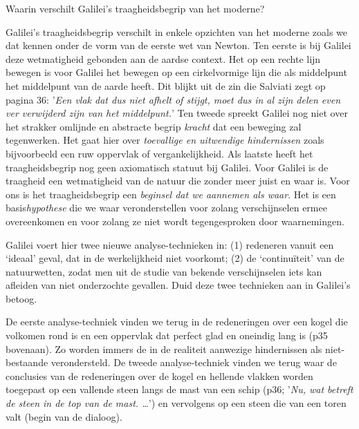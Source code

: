 \documentclass{ximera}
\begin{document}
\begin{exercise}
    \begin{question}  Waarin verschilt Galilei's traagheidsbegrip van het moderne?
	\begin{oplossing}
	Galilei's traagheidsbegrip verschilt in enkele opzichten van het moderne zoals we dat kennen onder de vorm van de eerste wet van Newton. Ten eerste is bij Galilei deze wetmatigheid gebonden aan de aardse context. Het op een rechte lijn bewegen is voor Galilei het bewegen op een cirkelvormige lijn die als middelpunt het middelpunt van de aarde heeft. Dit blijkt uit de zin die Salviati zegt op pagina 36: '\emph{Een vlak dat dus niet afhelt of stijgt, moet dus in al zijn delen even ver verwijderd zijn van het middelpunt.}' Ten tweede spreekt Galilei nog niet over het strakker omlijnde en abstracte begrip \emph{kracht} dat een beweging zal tegenwerken. Het gaat hier over \emph{toevallige en uitwendige hindernissen} zoals bijvoorbeeld een ruw oppervlak of vergankelijkheid. Als laatste heeft het traagheidsbegrip nog geen axiomatisch statuut bij Galilei. Voor Galilei is de traagheid een wetmatigheid van de natuur die zonder meer juist en waar is. Voor ons is het traagheidsbegrip een \emph{beginsel dat we aannemen als waar}. Het is een basis\emph{hypothese} die we waar veronderstellen voor zolang verschijnselen ermee overeenkomen en voor zolang ze niet wordt tegengesproken door waarnemingen.
	\end{oplossing}
	\end{question}
	
    \begin{question}  Galilei voert hier twee nieuwe analyse-technieken in: (1) redeneren vanuit een `ideaal' geval, dat in de werkelijkheid niet voorkomt; (2) de `continu\"iteit' van de natuurwetten, zodat men uit de studie van bekende verschijnselen iets kan afleiden van niet onderzochte gevallen. Duid deze twee technieken aan in Galilei's betoog.
	\begin{oplossing}
	De eerste analyse-techniek vinden we terug in de redeneringen over een kogel die volkomen rond is en een oppervlak dat perfect glad en oneindig lang is (p35 bovenaan). Zo worden immers de in de realiteit aanwezige hindernissen als niet-bestaande verondersteld.
	De tweede analyse-techniek vinden we terug waar de conclusies van de redeneringen over de kogel en hellende vlakken worden toegepast op een vallende steen langs de mast van een schip (p36; '\emph{Nu, wat betreft de steen in de top van de mast. \ldots}') en vervolgens op een steen die van een toren valt (begin van de dialoog).
	\end{oplossing}
	\end{question}
	

\end{exercise}
\end{document}
